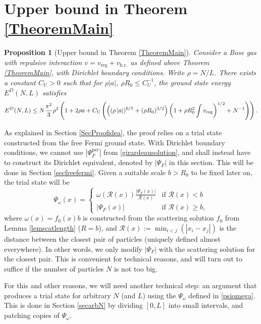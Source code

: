 \documentclass[a4paper,11pt]{article}
\newcommand{\abs}[1]{\left\lvert #1 \right\rvert}
\newcommand{\rr}{\mathcal{R}}
\newtheorem{proposition}[theorem]{Proposition}
\numberwithin{equation}{section}
\begin{document}
	\section{Upper bound in Theorem \ref{TheoremMain}}	
	\label{SecUpperbound} 
	\begin{proposition}[Upper bound in Theorem \ref{TheoremMain}]
		\label{PropositionUpperBound}
		Consider a Bose gas with repulsive interaction  $v=v_{\text{reg}}+v_{\text{h.c.}}$ as defined above Theorem \ref{TheoremMain}, with Dirichlet boundary conditions. Write $\rho=N/L$. There exists a constant $C_\text{U}>0$ such that for $\rho|a|$, $\rho R_0\leq C_U^{-1}$, the ground state energy $E^D(N,L)$ satisfies
		\begin{equation}
			\label{equpper}
			E^D(N,L)\leq N\frac{\pi^2}{3}\rho^2\left(1+2\rho a + C_\text{U}\left(\left((\rho\abs{a})^{6/5}+(\rho R_0)^{3/2}\right)\left(1+\rho R_0^2 \int v_{\textnormal{reg}}\right)^{1/2}+N^{-1}\right)\right).
		\end{equation}
	\end{proposition}
	
	As explained in Section \ref{SecProofidea}, the proof relies on a trial state constructed from the free Fermi ground state. With Dirichlet boundary conditions, we cannot use $\abs{\Psi^{\text{per}}_F}$ from \eqref{girardeausolution}, and shall instead have to construct its Dirichlet equivalent, denoted by $\abs{\Psi_F}$ in this section. This will be done in Section \ref{secfreefermi}. Given a suitable scale $ b>R_0 $ to be fixed later on, the trial state will be	
	\begin{equation}
		\label{psiomega}
		\Psi_\omega(x)=\begin{cases}
			\omega(\rr(x))\frac{\abs{\Psi_F(x)}}{\rr(x)}& \text{if }\rr(x)<b\\
			\abs{\Psi_F(x)}&\text{if }\rr(x)\geq b,
		\end{cases}
	\end{equation}  
	where $ \omega(x)=f_0(x)b$ is constructed from the scattering solution $f_0$ from Lemma \ref{lemscatlength} ($R=b$),  and $\rr(x):=\min_{i<j}(\abs{x_i-x_j}) $ is the distance between the closest pair of particles (uniquely defined almost everywhere). In other words, we only modify $|\Psi_F|$ with the scattering solution for the closest pair. This is convenient for technical reasons, and will turn out to suffice if the number of particles $N$ is not too big.
	
	For this and other reasons, we will need another technical step: an argument that produces a trial state for arbitrary $N$ (and $L$) using the $\Psi_\omega$ defined in \eqref{psiomega}. This is done in Section \ref{secarbN} by dividing $[0,L]$ into small intervals, and patching copies of $\Psi_\omega$. 
	
\end{document}
